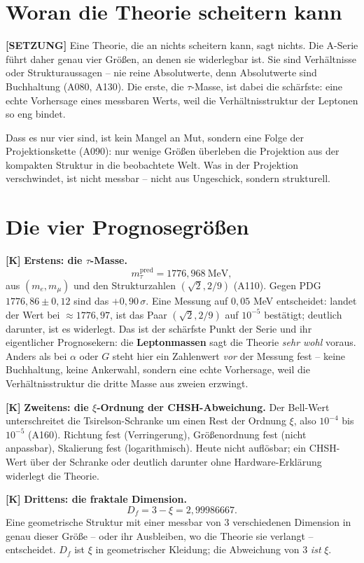 \section{Woran die Theorie scheitern kann}

\textbf{[SETZUNG]} Eine Theorie, die an nichts scheitern kann, sagt nichts. Die
A-Serie führt daher genau vier Größen, an denen sie widerlegbar ist. Sie sind
Verhältnisse oder Strukturaussagen -- nie reine Absolutwerte, denn Absolutwerte
sind Buchhaltung (A080, A130). Die erste, die $\tau$-Masse, ist dabei die
schärfste: eine echte Vorhersage eines messbaren Werts, weil die
Verhältnisstruktur der Leptonen so eng bindet.

Dass es nur vier sind, ist kein Mangel an Mut, sondern eine Folge der
Projektionskette (A090): nur wenige Größen überleben die Projektion aus der
kompakten Struktur in die beobachtete Welt. Was in der Projektion verschwindet,
ist nicht messbar -- nicht aus Ungeschick, sondern strukturell.

\section{Die vier Prognosegrößen}

\textbf{[K]} \textbf{Erstens: die $\tau$-Masse.}
\[
  m_\tau^\text{pred} = 1776{,}968\ \text{MeV},
\]
aus $(m_e, m_\mu)$ und den Strukturzahlen $(\sqrt2, 2/9)$ (A110). Gegen PDG
$1776{,}86\pm0{,}12$ sind das $+0{,}90\,\sigma$. Eine Messung auf $0{,}05$ MeV
entscheidet: landet der Wert bei $\approx 1776{,}97$, ist das Paar
$(\sqrt2, 2/9)$ auf $10^{-5}$ bestätigt; deutlich darunter, ist es widerlegt.
Das ist der schärfste Punkt der Serie und ihr eigentlicher Prognosekern: die
\textbf{Leptonmassen} sagt die Theorie \emph{sehr wohl} voraus. Anders als bei
$\alpha$ oder $G$ steht hier ein Zahlenwert \emph{vor} der Messung fest -- keine
Buchhaltung, keine Ankerwahl, sondern eine echte Vorhersage, weil die
Verhältnisstruktur die dritte Masse aus zweien erzwingt.

\textbf{[K]} \textbf{Zweitens: die $\xi$-Ordnung der CHSH-Abweichung.} Der
Bell-Wert unterschreitet die Tsirelson-Schranke um einen Rest der Ordnung
$\xi$, also $10^{-4}$ bis $10^{-5}$ (A160). Richtung fest (Verringerung),
Größenordnung fest (nicht anpassbar), Skalierung fest (logarithmisch). Heute
nicht auflösbar; ein CHSH-Wert über der Schranke oder deutlich darunter ohne
Hardware-Erklärung widerlegt die Theorie.

\textbf{[K]} \textbf{Drittens: die fraktale Dimension.}
\[
  D_f = 3 - \xi = 2{,}99986667 .
\]
Eine geometrische Struktur mit einer messbar von $3$ verschiedenen Dimension in
genau dieser Größe -- oder ihr Ausbleiben, wo die Theorie sie verlangt --
entscheidet. $D_f$ ist $\xi$ in geometrischer Kleidung; die Abweichung von $3$
\emph{ist} $\xi$.

